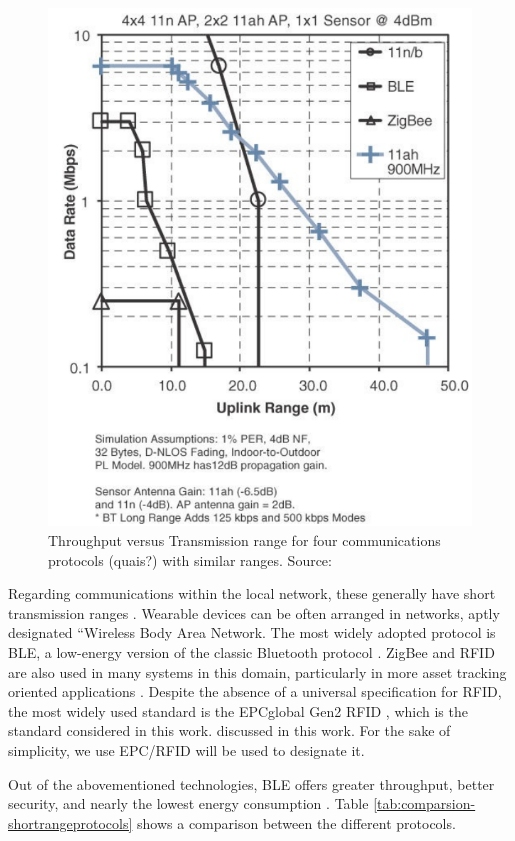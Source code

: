 \begin{figure}[H] 
    \centering
    \includegraphics[width=0.55\linewidth]{images/communication-protocols-throughput.png}
    \caption{Throughput versus Transmission range for four communications protocols (quais?) with similar ranges. Source: \cite{10.5555/3161403}}
    \label{fig:communication-protocols-throughput}
\end{figure}

Regarding communications within the local network, these generally have short transmission ranges \cite{Baker2017}. Wearable devices can be often arranged in networks, aptly designated ``Wireless Body Area Network. The most widely adopted protocol is \acf{BLE}, a low-energy version of the classic Bluetooth protocol \cite{Doukas2012, Wu2019, Wu2020}. ZigBee and \acf{RFID} are also used in many systems in this domain, particularly in more asset tracking oriented applications \cite{Fuhrer2006, Catarinucci2015, Adame2018}. Despite the absence of a universal specification for \acs{RFID}, the most widely used standard is the EPCglobal Gen2 RFID \cite{EPCglobal2006}, which is the standard considered in this work. discussed in this work. For the sake of simplicity, we use \acs{EPC/RFID}  will be used to designate it. \bigskip

Out of the abovementioned technologies, \acs{BLE} offers greater throughput, better security, and nearly the lowest energy consumption \cite{dementyev2013power}. Table \ref{tab:comparsion-shortrangeprotocols} shows a comparison between the different protocols.

